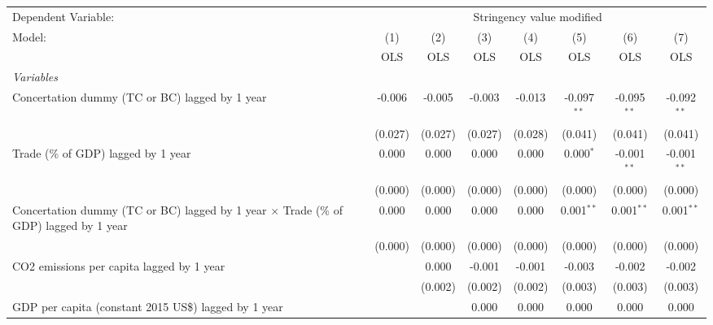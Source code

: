 
\begingroup
\centering
\begin{tabular}{lccccccc}
   \toprule
   Dependent Variable: & \multicolumn{7}{c}{Stringency value modified}\\
   Model:                                                                                       & (1)     & (2)     & (3)     & (4)     & (5)           & (6)           & (7)\\  
                                                                                                &  OLS    & OLS     & OLS     & OLS     & OLS           & OLS           & OLS\\  
   \midrule
   \emph{Variables}\\
   Concertation dummy (TC or BC) lagged by 1 year                                               & -0.006  & -0.005  & -0.003  & -0.013  & -0.097$^{**}$ & -0.095$^{**}$ & -0.092$^{**}$\\   
                                                                                                & (0.027) & (0.027) & (0.027) & (0.028) & (0.041)       & (0.041)       & (0.041)\\   
   Trade (\% of GDP) lagged by 1 year                                                           & 0.000   & 0.000   & 0.000   & 0.000   & 0.000$^{*}$   & -0.001$^{**}$ & -0.001$^{**}$\\   
                                                                                                & (0.000) & (0.000) & (0.000) & (0.000) & (0.000)       & (0.000)       & (0.000)\\   
   Concertation dummy (TC or BC) lagged by 1 year $\times$ Trade (\% of GDP) lagged by 1 year   & 0.000   & 0.000   & 0.000   & 0.000   & 0.001$^{**}$  & 0.001$^{**}$  & 0.001$^{**}$\\   
                                                                                                & (0.000) & (0.000) & (0.000) & (0.000) & (0.000)       & (0.000)       & (0.000)\\   
   CO2 emissions per capita lagged by 1 year                                                    &         & 0.000   & -0.001  & -0.001  & -0.003        & -0.002        & -0.002\\   
                                                                                                &         & (0.002) & (0.002) & (0.002) & (0.003)       & (0.003)       & (0.003)\\   
   GDP per capita (constant 2015 US\$) lagged by 1 year                                         &         &         & 0.000   & 0.000   & 0.000         & 0.000         & 0.000\\   

\end{tabular}
